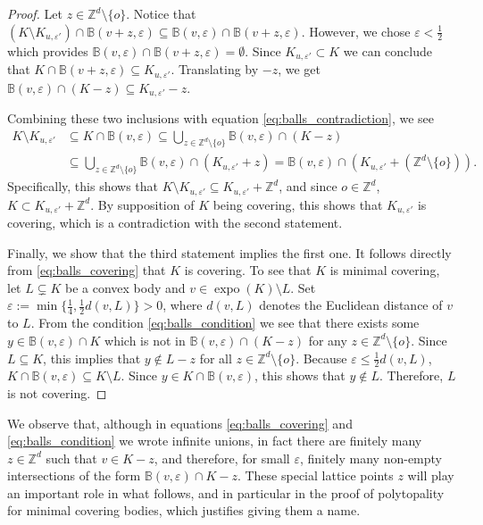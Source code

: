\documentclass[11pt, a4paper]{amsart}
\newcommand{\ZZ}{\mathbb{Z}}
\newcommand{\ball}{\mathbb{B}}
\DeclareMathOperator{\expo}{expo}
\newcommand{\origin}{o}
\numberwithin{equation}{section}
\theoremstyle{plain}
\begin{document}
\begin{proof}
 Let $z\in \ZZ^d\setminus \{ \origin\}$. Notice that $(K\setminus K_{u, \varepsilon'})\cap \ball(v+z, \varepsilon)\subseteq \ball(v,\varepsilon)\cap \ball(v+z,\varepsilon)$. However, we chose $\varepsilon < \frac{1}{2}$ which provides $\ball(v, \varepsilon)\cap\ball(v+z,\varepsilon)=\emptyset$. Since $K_{u,\varepsilon'}\subset K$ we can conclude that $K\cap \ball(v+z, \varepsilon)\subseteq K_{u,\varepsilon'}$. Translating by $-z$, we get \(\ball(v,\varepsilon)\cap(K-z)\subseteq K_{u,\varepsilon'}-z\).
 
Combining these two inclusions with equation \eqref{eq:balls_contradiction}, we see
\[
\begin{split}
K\setminus K_{u,\varepsilon'}&\subseteq K\cap \ball(v,\varepsilon)\subseteq \bigcup\limits_{z\in \ZZ^d\setminus\{\origin\}}\ball(v,\varepsilon)\cap(K-z)\\
&\subseteq \bigcup\limits_{z\in \ZZ^d\setminus\{\origin\}}\ball(v,\varepsilon)\cap(K_{u,\varepsilon'}+z)=\ball(v,\varepsilon)\cap (K_{u,\varepsilon'}+(\ZZ^d\setminus\{\origin\})).
\end{split}
\]
Specifically, this shows that $K\setminus K_{u, \varepsilon'}\subseteq K_{u, \varepsilon'}+\ZZ^d$, and since $\origin\in \ZZ^d$, $K\subset K_{u, \varepsilon'}+\ZZ^d$. By supposition of $K$ being covering, this shows that $K_{u, \varepsilon'}$ is covering, which is a contradiction with the second statement. 

Finally, we show that the third statement implies the first one. It follows directly from \eqref{eq:balls_covering} that $K$ is covering. To see that $K$ is minimal covering, let $L\subsetneq K$ be a convex body and $v\in \expo(K)\setminus L$. Set $\varepsilon:=\min \{ \frac{1}{4}, \frac{1}{2}d(v,L)\}>0$, where $d(v,L)$ denotes the Euclidean distance of $v$ to $L$. From the condition \eqref{eq:balls_condition} we see that there exists some $y\in \ball(v,\varepsilon)\cap K$ which is not in $\ball(v,\varepsilon)\cap (K-z)$ for any $z\in \ZZ^d\setminus\{\origin\}$. Since $L\subseteq K$, this implies that $y\notin L-z$ for all $z\in \ZZ^d\setminus \{\origin\}$. Because $\varepsilon\leq\frac{1}{2}d(v,L)$, $K\cap \ball(v,\varepsilon)\subseteq K\setminus L$. Since $y\in K\cap \ball(v,\varepsilon)$, this shows that $y\notin L$. Therefore, $L$ is not covering.
\end{proof}

We observe that, although in equations \eqref{eq:balls_covering} and \eqref{eq:balls_condition} we wrote infinite unions, in fact there are finitely many $z \in \ZZ^d$ such that $v \in K-z$, and therefore, for small $\varepsilon$, finitely many non-empty intersections of the form $\ball(v, \varepsilon)\cap K-z$. These special lattice points $z$ will play an important role in what follows, and in particular in the proof of polytopality for minimal covering bodies, which justifies giving them a name. 
\end{document}
